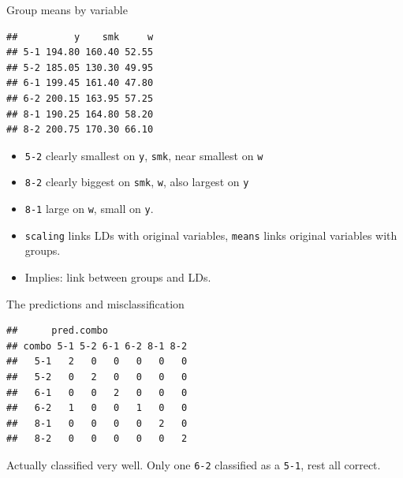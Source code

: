 \begin{frame}[fragile]{Group means by variable}
  
\begin{knitrout}
\color{fgcolor}\begin{kframe}
\begin{alltt}
\hlopt{$}
\end{alltt}
\begin{verbatim}
##          y    smk     w
## 5-1 194.80 160.40 52.55
## 5-2 185.05 130.30 49.95
## 6-1 199.45 161.40 47.80
## 6-2 200.15 163.95 57.25
## 8-1 190.25 164.80 58.20
## 8-2 200.75 170.30 66.10
\end{verbatim}
\end{kframe}
\end{knitrout}

\begin{itemize}
\item \texttt{5-2} clearly smallest on \texttt{y}, \texttt{smk}, near
  smallest on \texttt{w}
\item \texttt{8-2} clearly biggest on \texttt{smk}, \texttt{w}, also
  largest on \texttt{y}
\item \texttt{8-1} large on \texttt{w}, small on \texttt{y}.
\item \texttt{scaling} links LDs with original variables,
  \texttt{means} links original variables with groups.
\item Implies: link between groups and LDs.
\end{itemize}
  
\end{frame}


\begin{frame}[fragile]{The predictions and misclassification}
  
\begin{knitrout}
\color{fgcolor}\begin{kframe}
\begin{alltt}
\hlkwb{=}
\hlopt{$}
\end{alltt}
\begin{verbatim}
##      pred.combo
## combo 5-1 5-2 6-1 6-2 8-1 8-2
##   5-1   2   0   0   0   0   0
##   5-2   0   2   0   0   0   0
##   6-1   0   0   2   0   0   0
##   6-2   1   0   0   1   0   0
##   8-1   0   0   0   0   2   0
##   8-2   0   0   0   0   0   2
\end{verbatim}
\end{kframe}
\end{knitrout}
Actually classified very well. Only one \texttt{6-2} classified as a
\texttt{5-1}, rest all correct.
  
\end{frame}

